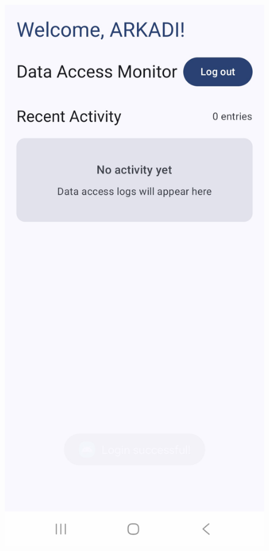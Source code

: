 \begin{figure}[H]
\begin{minipage}{0.32\textwidth}
    \centering
    \includegraphics[width=\textwidth]{english/figures/Screenshot_20250812_212306_Data Access Notifier.jpg}

\end{minipage}
\end{figure}
